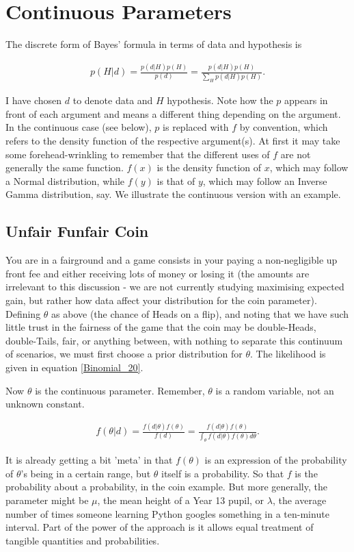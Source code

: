 \documentclass{article}
\begin{document}
\section{Continuous Parameters}
The discrete form of Bayes' formula in terms of data and hypothesis is

\begin{align}
\displaystyle p(H|d)= \frac{p(d|H)p(H)}{p(d)} 
= \frac{p(d|H)p(H)}{\sum_H {p(d|H)p(H)}}.
\end{align}


I have  chosen $d$ to denote data and $H$ hypothesis. Note how the $p$ appears in front of each argument and means a different thing depending on the argument. In the continuous case (see below), $p$ is replaced with $f$ by convention, which refers to the density function of the respective argument(s). At first it may take some forehead-wrinkling to remember that the different uses of $f$ are not generally the same function. $f(x)$ is the density function of $x$, which may follow a Normal distribution, while $f(y)$ is that of $y$, which may follow an Inverse Gamma distribution, say. We illustrate the continuous version with an example.

\subsection{Unfair Funfair Coin}
You are in a fairground and a game consists in your paying a non-negligible up front fee and either receiving lots of money or losing it (the amounts are irrelevant to this discussion - we are not currently studying maximising expected gain, but rather how data affect your distribution for the coin parameter). Defining $\theta$ as above (the chance of Heads on a flip), and noting that we have such little trust in the fairness of the game that the coin may be double-Heads, double-Tails, fair, or anything between, with nothing to separate this continuum of scenarios, we must first choose a prior distribution for $\theta$. The likelihood is given in equation \eqref{Binomial_20}.

Now $\theta$ is the continuous parameter. Remember, $\theta$ is a random variable, not an unknown constant.

\begin{align}
f(\theta|d) = \frac{f(d|\theta)f(\theta)}{f(d)}
= \frac{f(d|\theta)f(\theta)}{\int_{\theta} f(d|\theta)f(\theta)d\theta}.
\end{align}

It is already getting a bit 'meta' in that $f(\theta)$ is an expression of the probability of $\theta$'s being in a certain range, but $\theta$ itself is a probability. So that $f$ is the probability about a probability, in the coin example. But more generally, the parameter might be $\mu$, the mean height of a Year 13 pupil, or $\lambda$, the average number of times someone learning Python googles something in a ten-minute interval. Part of the power of the approach is it allows equal treatment of tangible quantities and probabilities.
\end{document}
